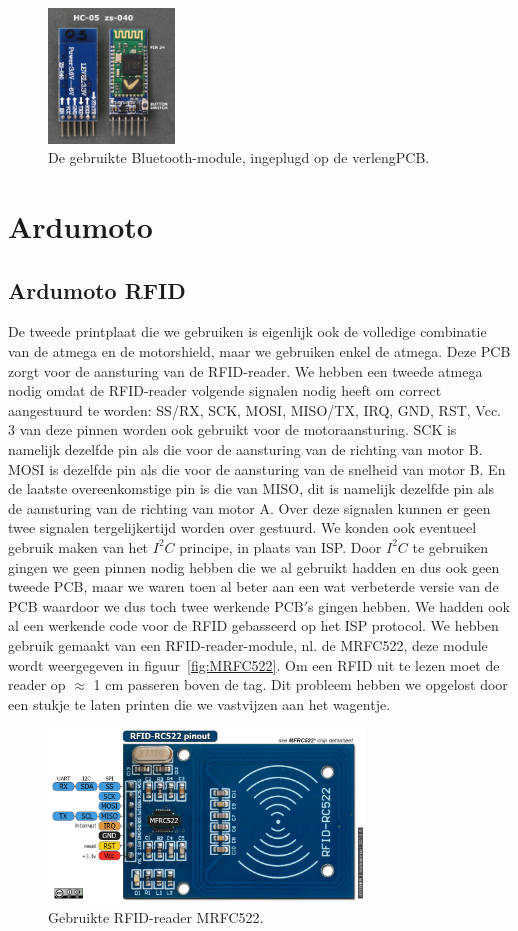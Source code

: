 \begin{figure}[h]
\centering
\includegraphics[width=0.3\textwidth]{HC05.jpg}
\caption{De gebruikte Bluetooth-module, ingeplugd op de verlengPCB.}
\label{fig:HC05}
\end{figure}
\section{Ardumoto}
\subsection{Ardumoto RFID}
De tweede printplaat die we gebruiken is eigenlijk ook de volledige combinatie van de atmega en de motorshield, maar we gebruiken enkel de atmega. Deze PCB zorgt voor de aansturing van de RFID-reader. We hebben een tweede atmega nodig omdat de RFID-reader volgende signalen nodig heeft om correct aangestuurd te worden: SS/RX, SCK, MOSI, MISO/TX, IRQ, GND, RST, Vcc. 3 van deze pinnen worden ook gebruikt voor de motoraansturing. SCK is namelijk dezelfde pin als die voor de aansturing van de richting van motor B. MOSI is dezelfde pin als die voor de aansturing van de snelheid van motor B. En de laatste overeenkomstige pin is die van MISO, dit is namelijk dezelfde pin als de aansturing van de richting van motor A. Over deze signalen kunnen er geen twee signalen tergelijkertijd worden over gestuurd. We konden ook eventueel gebruik maken van het $I^{2}C$ principe, in plaats van ISP. Door $I^{2}C$ te gebruiken gingen we geen pinnen nodig hebben die we al gebruikt hadden en dus ook geen tweede PCB, maar we waren toen al beter aan een wat verbeterde versie van de PCB waardoor we dus toch twee werkende PCB$\prime$s gingen hebben. We hadden ook al een werkende code voor de RFID gebasseerd op het ISP protocol. We hebben gebruik gemaakt van een RFID-reader-module, nl. de MRFC522, deze module wordt weergegeven in figuur~\ref{fig:MRFC522}. Om een RFID uit te lezen moet de reader op $\approx$ 1 cm passeren boven de tag. Dit probleem hebben we opgelost door een stukje te laten printen die we vastvijzen aan het wagentje.
\begin{figure}[h]
\centering
\includegraphics[width=0.75\textwidth]{MRFC522.png}
\caption{Gebruikte RFID-reader MRFC522. \label{fig:MRFC522}}
\label{fig:ACEquiv}
\end{figure}
